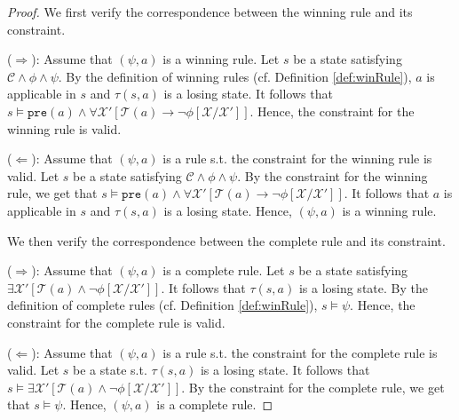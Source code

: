 \documentclass[review]{elsarticle}
\newcommand{\set}[1]{\{ #1 \}}
\newcommand{\statevar}{\mathcal{X}}
\newcommand{\trans}{\mathcal{T}}
\newcommand{\constraint}{\mathcal{C}}
\newcommand{\pre}{\mathtt{pre}}
\newcommand{\suc}{\tau}
\begin{document}
\begin{proof}
	We first verify the correspondence between the winning rule and its constraint. %
	
	($\Rightarrow$): Assume that $(\psi, a)$ is a winning rule.
	Let $s$ be a state satisfying $\constraint \land \phi \land \psi$.
	By the definition of winning rules (cf. Definition \ref{def:winRule}), $a$ is applicable in $s$ and $\suc(s, a)$ is a losing state.
	It follows that $s \models \pre(a) \land \forall \statevar' [\trans(a) \rightarrow \neg \phi[\statevar/\statevar']]$.
	Hence, the constraint for the winning rule is valid.
	
	($\Leftarrow$): Assume that $(\psi, a)$ is a rule s.t. the constraint for the winning rule is valid.
	Let $s$ be a state satisfying $\constraint \land \phi \land \psi$.
	By the constraint for the winning rule, we get that $s \models \pre(a) \land \forall \statevar' [\trans(a) \rightarrow \neg \phi[\statevar/\statevar']]$.
	It follows that $a$ is applicable in $s$ and $\suc(s, a)$ is a losing state.
	Hence, $(\psi, a)$ is a winning rule.
	
	We then verify the correspondence between the complete rule and its constraint.
	
	($\Rightarrow$): Assume that $(\psi, a)$ is a complete rule.
	Let $s$ be a state satisfying $\exists \statevar' [\trans(a) \land \neg \phi[\statevar/\statevar']]$.
	It follows that $\suc(s, a)$ is a losing state.	
	By the definition of complete rules (cf. Definition \ref{def:winRule}), $s \models \psi$.
	Hence, the constraint for the complete rule is valid.
	
	($\Leftarrow$): Assume that $(\psi, a)$ is a rule s.t. the constraint for the complete rule is valid.
	Let $s$ be a state s.t. $\suc(s, a)$ is a losing state.
	It follows that $s \models \exists \statevar' [\trans(a) \land \neg \phi[\statevar/\statevar']]$.
	By the constraint for the complete rule, we get that $s \models \psi$.
	Hence,  $(\psi, a)$ is a complete rule.	
\end{proof}


\end{document}
